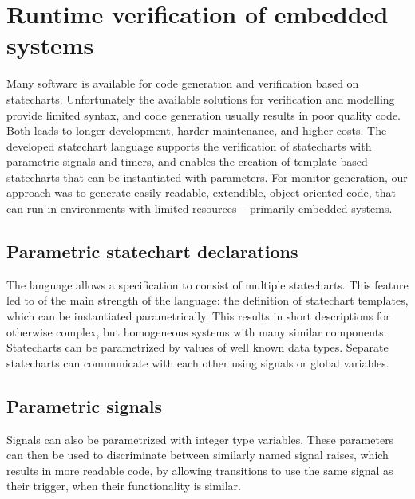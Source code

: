 \chapter{Runtime verification of embedded systems}
\label{chap:runtime_verification}
Many software is available for code generation and verification based on statecharts. Unfortunately the available solutions for verification and modelling provide limited syntax, and code generation usually results in poor quality code. Both leads to longer development, harder maintenance, and higher costs. The developed statechart language supports the verification of statecharts with parametric signals and timers, and enables the creation of template based statecharts that can be instantiated with parameters. For monitor generation, our approach was to generate easily readable, extendible, object oriented code, that can run in environments with limited resources -- primarily embedded systems.
\section{Parametric statechart declarations}
The language allows a specification to consist of multiple statecharts. This feature led to of the main strength of the language: the definition of statechart templates, which can be instantiated parametrically. This results in short descriptions for otherwise complex, but homogeneous systems with many similar components. Statecharts can be parametrized by values of well known data types. Separate statecharts can communicate with each other using signals or global variables.
\section{Parametric signals}
Signals can also be parametrized with integer type variables. These parameters can then be used to discriminate between similarly named signal raises, which results in more readable code, by allowing transitions to use the same signal as their trigger, when their functionality is similar.
